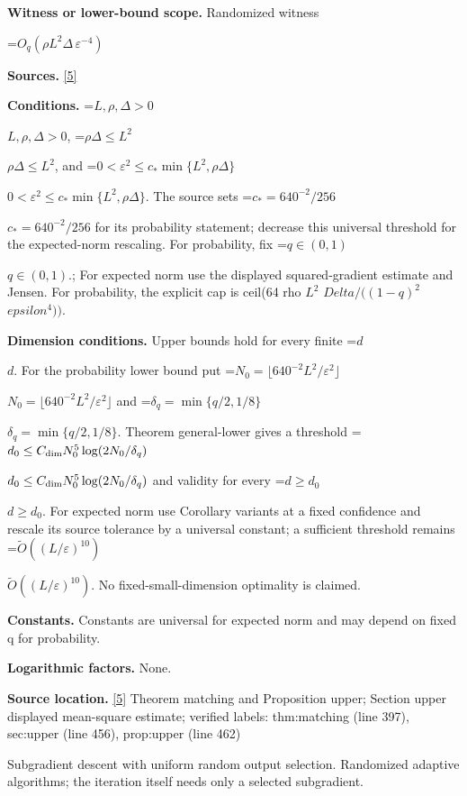\documentclass[10pt,a4paper]{article}
\newcommand{\AtlasMath}[1]{\par\begingroup\centering\setbox0=\hbox{$\displaystyle #1$}\ifdim\wd0>1.4\linewidth\typeout{ATLAS WIDE FORMULA: \the\wd0}\fi\ifdim\wd0>\linewidth\resizebox{\linewidth}{!}{\box0}\else\box0\fi\par\endgroup}
\newcommand{\AtlasInlineMath}[1]{\begingroup\setbox0=\hbox{$#1$}\ifdim\wd0>.4\linewidth\endgroup\AtlasMath{#1}\else\endgroup$#1$\fi}
\begin{document}
\textbf{Witness or lower-bound scope.} Randomized witness



\AtlasMath{O_q(\rho L^2\Delta\,\varepsilon^{-4})}


\textbf{Sources.} \href{https://github.com/WU-Wendao/Colombo/blob/main/colombo_sensorium/Complexity_altas/data/sources/colombo/N01/manuscript.pdf}{[5]}



\textbf{Conditions.} \AtlasInlineMath{L,\rho,\Delta>0}, \AtlasInlineMath{\rho\Delta\le L^2}, and \AtlasInlineMath{0<\varepsilon^2\le c_*\min\{L^2,\rho\Delta\}}. The source sets \AtlasInlineMath{c_*=640^{-2}/256} for its probability statement; decrease this universal threshold for the expected-norm rescaling. For probability, fix \AtlasInlineMath{q\in(0,1)}.; For expected norm use the displayed squared-gradient estimate and Jensen. For probability, the explicit cap is ceil(64 rho $L^2$ $Delta/((1-q)^2$ $epsilon^4))$.



\textbf{Dimension conditions.} Upper bounds hold for every finite \AtlasInlineMath{d}. For the probability lower bound put \AtlasInlineMath{N_0=\lfloor640^{-2}L^2/\varepsilon^2\rfloor} and \AtlasInlineMath{\delta_q=\min\{q/2,1/8\}}. Theorem general-lower gives a threshold \AtlasInlineMath{d_0\le C_{\rm dim}N_0^5\log(2N_0/\delta_q)} and validity for every \AtlasInlineMath{d\ge d_0}. For expected norm use Corollary variants at a fixed confidence and rescale its source tolerance by a universal constant; a sufficient threshold remains \AtlasInlineMath{\widetilde O((L/\varepsilon)^{10})}. No fixed-small-dimension optimality is claimed.



\textbf{Constants.} Constants are universal for expected norm and may depend on fixed q for probability.



\textbf{Logarithmic factors.} None.



\textbf{Source location.} \href{https://github.com/WU-Wendao/Colombo/blob/main/colombo_sensorium/Complexity_altas/data/sources/colombo/N01/manuscript.pdf}{[5]} Theorem matching and Proposition upper; Section upper displayed mean-square estimate; verified labels: thm:matching (line 397), sec:upper (line 456), prop:upper (line 462)



Subgradient descent with uniform random output selection. Randomized adaptive algorithms; the iteration itself needs only a selected subgradient.
\end{document}
